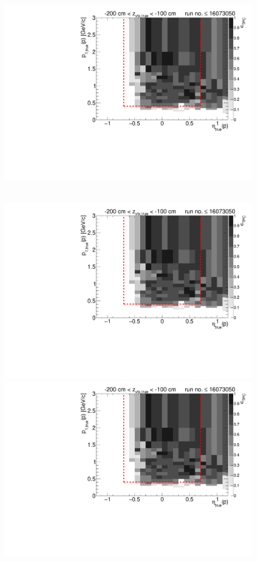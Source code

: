 \begin{figure}[hb]
{  \includegraphics[width=\linewidth,page=17]{graphics/eff/Eff2D_TPC_proton_Minus_RunRange1.pdf}
}~
\parbox{0.495\textwidth}{
  \centering
  \includegraphics[width=\linewidth,page=12]{graphics/eff/Eff2D_TPC_proton_Minus_RunRange1.pdf}\\
  \includegraphics[width=\linewidth,page=14]{graphics/eff/Eff2D_TPC_proton_Minus_RunRange1.pdf}\\
}
\end{figure}
